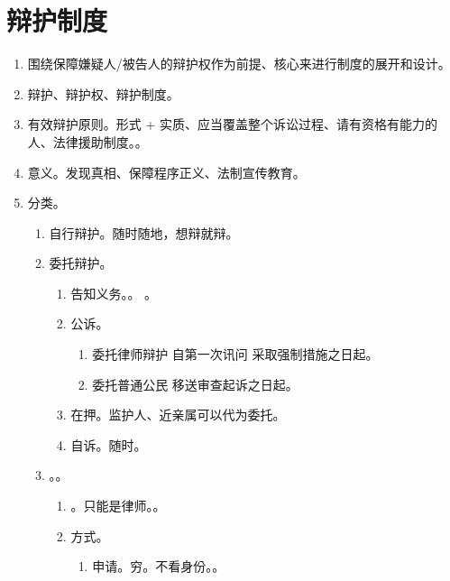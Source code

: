 \section{辩护制度}
\begin{enumerate}
  \item 围绕保障嫌疑人/被告人的辩护权作为前提、核心来进行制度的展开和设计。
  \item 辩护、辩护权、辩护制度。
  \item 有效辩护原则。形式 + 实质、应当覆盖整个诉讼过程、请有资格有能力的人、法律援助制度。。
  \item 意义。发现真相、保障程序正义、法制宣传教育。
  \item 分类。
        \begin{enumerate}
          \item 自行辩护。随时随地，想辩就辩。
          \item 委托辩护。
                \begin{enumerate}
                  \item 告知义务。。
                        。
                  \item 公诉。
                        \begin{enumerate}
                          \item 委托律师辩护 \yjt 自第一次讯问 \hz 采取强制措施之日起。
                          \item 委托普通公民 \yjt 移送审查起诉之日起。
                        \end{enumerate}
                  \item 在押。监护人、近亲属可以代为委托。
                  \item 自诉。随时。
                \end{enumerate}
          \item {}。。
                \begin{enumerate}
                  \item {}。只能是律师。。
                  \item 方式。
                        \begin{enumerate}
                          \item 申请。穷。不看身份。。

\end{enumerate}
\end{enumerate}
\end{enumerate}
\end{enumerate}

